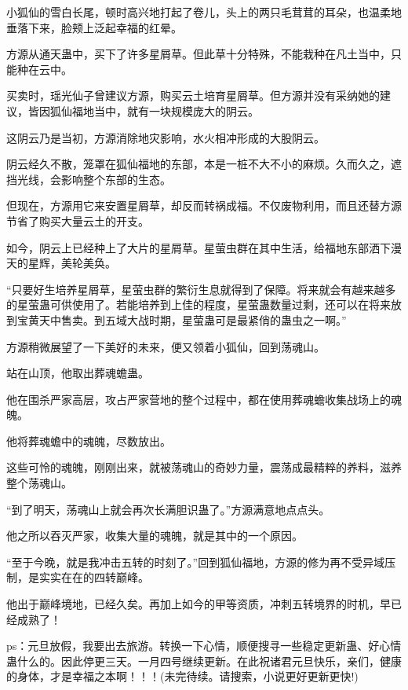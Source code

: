 \begin{this_body}
小狐仙的雪白长尾，顿时高兴地打起了卷儿，头上的两只毛茸茸的耳朵，也温柔地垂落下来，脸颊上泛起幸福的红晕。

方源从通天蛊中，买下了许多星屑草。但此草十分特殊，不能栽种在凡土当中，只能种在云中。

买卖时，瑶光仙子曾建议方源，购买云土培育星屑草。但方源并没有采纳她的建议，皆因狐仙福地当中，就有一块规模庞大的阴云。

这阴云乃是当初，方源消除地灾影响，水火相冲形成的大股阴云。

阴云经久不散，笼罩在狐仙福地的东部，本是一桩不大不小的麻烦。久而久之，遮挡光线，会影响整个东部的生态。

但现在，方源用它来安置星屑草，却反而转祸成福。不仅废物利用，而且还替方源节省了购买大量云土的开支。

如今，阴云上已经种上了大片的星屑草。星萤虫群在其中生活，给福地东部洒下漫天的星辉，美轮美奂。

“只要好生培养星屑草，星萤虫群的繁衍生息就得到了保障。将来就会有越来越多的星萤蛊可供使用了。若能培养到上佳的程度，星萤蛊数量过剩，还可以在将来放到宝黄天中售卖。到五域大战时期，星萤蛊可是最紧俏的蛊虫之一啊。”

方源稍微展望了一下美好的未来，便又领着小狐仙，回到荡魂山。

站在山顶，他取出葬魂蟾蛊。

他在围杀严家高层，攻占严家营地的整个过程中，都在使用葬魂蟾收集战场上的魂魄。

他将葬魂蟾中的魂魄，尽数放出。

这些可怜的魂魄，刚刚出来，就被荡魂山的奇妙力量，震荡成最精粹的养料，滋养整个荡魂山。

“到了明天，荡魂山上就会再次长满胆识蛊了。”方源满意地点点头。

他之所以吞灭严家，收集大量的魂魄，就是其中的一个原因。

“至于今晚，就是我冲击五转的时刻了。”回到狐仙福地，方源的修为再不受异域压制，是实实在在的四转巅峰。

他出于巅峰境地，已经久矣。再加上如今的甲等资质，冲刺五转境界的时机，早已经成熟了！

ps：元旦放假，我要出去旅游。转换一下心情，顺便搜寻一些稳定更新蛊、好心情蛊什么的。因此停更三天。一月四号继续更新。在此祝诸君元旦快乐，亲们，健康的身体，才是幸福之本啊！！！(未完待续。请搜索，小说更好更新更快!)

\end{this_body}

